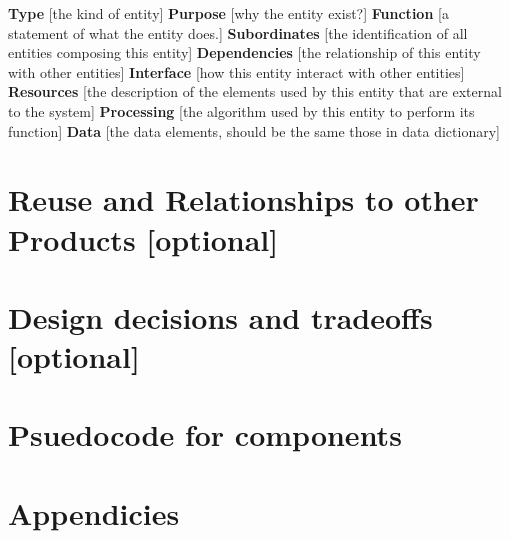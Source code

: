 \documentclass{article}
\begin{document}
\textbf{Type} [the kind of entity]
\textbf{Purpose} [why the entity exist?]
\textbf{Function} [a statement of what the entity does.]
\textbf{Subordinates} [the identification of all entities composing this entity]
\textbf{Dependencies} [the relationship of this entity with other entities]
\textbf{Interface} [how this entity interact with other entities]
\textbf{Resources} [the description of the elements used by this entity that are external to the system]
\textbf{Processing} [the algorithm used by this entity to perform its function]
\textbf{Data} [the data elements, should be the same those in data dictionary]

\newpage

\section{Reuse and Relationships to other Products [optional]}

\newpage

\section{Design decisions and tradeoffs [optional]}

\newpage

\section{Psuedocode for components}

\newpage

\section{Appendicies}

\newpage
\end{document}
